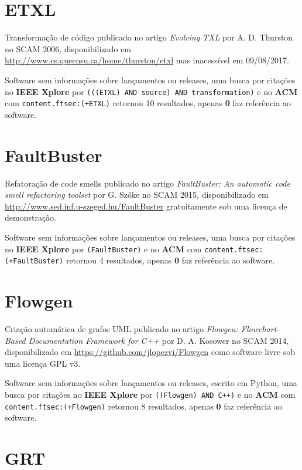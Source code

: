 \section{ETXL}

Transformação de código
publicado no artigo {\it Evolving TXL}
por A. D. Thurston
no SCAM 2006,
disponibilizado em \url{http://www.cs.queensu.ca/home/thurston/etxl}
mas inacessível em 09/08/2017.

Software sem informações sobre lançamentos ou releases,
uma busca por citações no {\bf IEEE Xplore} por
\texttt{(((ETXL) AND source) AND transformation)}
e no {\bf ACM} com
\texttt{content.ftsec:(+ETXL)}
retornou
10 resultados, apenas
{\bf 0} faz referência ao software.



\section{FaultBuster}

Refatoração de code smells
publicado no artigo {\it FaultBuster: An automatic code smell refactoring toolset}
por G. Szőke
no SCAM 2015,
disponibilizado em \url{http://www.sed.inf.u-szeged.hu/FaultBuster}
gratuitamente
sob uma licença de demonstração.

Software sem informações sobre lançamentos ou releases,
uma busca por citações no {\bf IEEE Xplore} por
\texttt{(FaultBuster)}
e no {\bf ACM} com
\texttt{content.ftsec:(+FaultBuster)}
retornou
4 resultados, apenas
{\bf 0} faz referência ao software.



\section{Flowgen}

Criação automática de grafos UML
publicado no artigo {\it Flowgen: Flowchart-Based Documentation Framework for C++}
por D. A. Kosower
no SCAM 2014,
disponibilizado em \url{https://github.com/jlopezvi/Flowgen}
como software livre
sob uma licença GPL v3.

Software sem informações sobre lançamentos ou releases,
escrito em Python,
uma busca por citações no {\bf IEEE Xplore} por
\texttt{((Flowgen) AND C++)}
e no {\bf ACM} com
\texttt{content.ftsec:(+Flowgen)}
retornou
8 resultados, apenas
{\bf 0} faz referência ao software.



\section{GRT}

